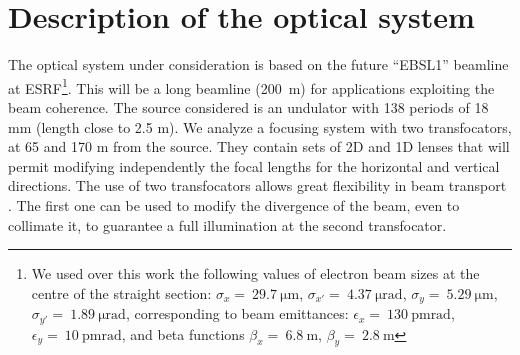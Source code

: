 \documentclass{iucr}
\begin{document}
\section{Description of the optical system}
\label{sec:beamline}

The optical system under consideration is based on the future ``EBSL1'' beamline at ESRF\footnote{We used over this work the following values of electron beam sizes at the centre of the straight section: $\sigma_x=~\SI{29.7}{\micro\meter}$,
$\sigma_{x'}=~\SI{4.37}{\micro\radian}$,
$\sigma_y=~\SI{5.29}{\micro\meter}$,
$\sigma_{y'}=~\SI{1.89}{\micro\radian}$, corresponding to beam emittances:  $\epsilon_x=~\SI{130}{\pico\meter \radian}$,
$\epsilon_y=~\SI{10}{\pico\meter \radian}$, and beta functions
$\beta_x=~\SI{6.8}{\meter}$,
$\beta_y=~\SI{2.8}{\meter}$
}. This will be a long beamline (\SI{200}{\meter}) for applications exploiting the beam coherence. The source considered is an undulator with 138 periods of 18 mm (length close to 2.5 m).  
We analyze a focusing system with two transfocators, at 65 and 170 m from the source. They contain sets of 2D and 1D lenses that will permit modifying independently the focal lengths for the horizontal and vertical directions. The use of two transfocators allows great flexibility in beam transport \cite{Vaughan:kv5084}. The first one can be used to modify the divergence of the beam, even to collimate it, to guarantee a full illumination at the second transfocator.  
\end{document}
